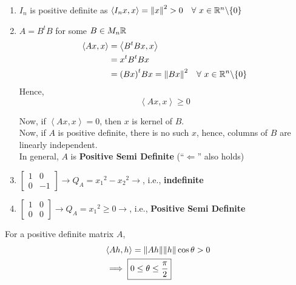 \documentclass[../Analysis-3.tex]{subfiles}
\begin{document}
\begin{Eg}{}{}
  \begin{enumerate}
    \item  $I_n$ is positive definite as $\left\langle I_nx, x \right\rangle = {\|x \|}^2 > 0 \quad \forall\ x \in \mathbb{R}^n \backslash \{0\}$
    \item $A = B^tB$ for some $B \in M_n{\mathbb{R}}$
          \begin{align*}
            \left\langle Ax,x \right\rangle & = \left\langle B^tBx,x \right\rangle                                    \\
                                            & = x^tB^tBx                                                              \\
                                            & = {(Bx)}^t Bx = {\| Bx \|}^2 \quad \forall\ x \in \mathbb{R}^n \backslash \{0\}
          \end{align*}
          Hence, \[ \left\langle Ax,x \right\rangle \geq 0 \]

          Now, if $ \left\langle Ax,x \right\rangle = 0 $, then  $x$ is kernel of $B$. \\
          Now, if $A$ is positive definite, there is no such $x$, hence, columns of $B$ are linearly independent. \\
          In general, $A$ is \textbf{Positive Semi Definite} (``$\Longleftarrow$'' also holds)

    \item $\begin{bmatrix}
              1 & 0  \\
              0 & -1
            \end{bmatrix} \longrightarrow Q_A = {x_1}^2 - {x_2}^2 \longrightarrow $, i.e., \textbf{indefinite}
    \item  $\begin{bmatrix}
              1 & 0 \\
              0 & 0
            \end{bmatrix} \longrightarrow Q_A = {x_1}^2 \geq 0 \longrightarrow $, i.e., \textbf{Positive Semi Definite}

  \end{enumerate}
\end{Eg}

For a positive definite matrix $ A $,
\begin{align*}
   & \left\langle Ah, h \right\rangle = \norm{Ah}\norm{h}\cos{\theta} > 0 \\
   & \implies \boxed{0 \leq \theta \leq \frac{\pi}{2}}
\end{align*}
\end{document}
